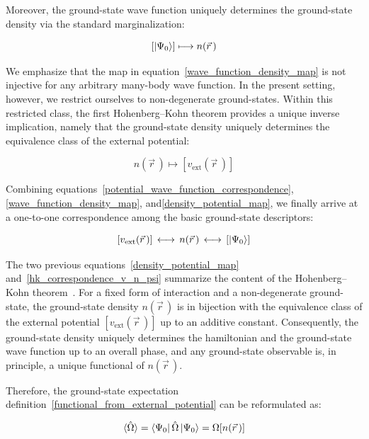 Moreover, the ground-state wave function uniquely determines the ground-state density via the standard marginalization:

\begin{equation}
    \left[\ket{\Psi_0}\right]\longmapsto n(\vec{r}\,)
\label{wave_function_density_map}
\end{equation}

We emphasize that the map in equation~\eqref{wave_function_density_map} is not injective for any arbitrary many-body wave function.
In the present setting, however, we restrict ourselves to non-degenerate ground-states. Within this restricted class, the first Hohenberg--Kohn theorem provides a unique inverse implication, namely that the ground-state density uniquely determines the equivalence class of the external potential:

\begin{equation}
    n(\vec{r}\,)\longmapsto\left[v_\mathrm{ext}(\vec{r}\,)\right]
\label{density_potential_map}
\end{equation}

Combining equations~\eqref{potential_wave_function_correspondence}, \eqref{wave_function_density_map},
and\eqref{density_potential_map}, we finally arrive at a one-to-one correspondence among the basic ground-state descriptors:

\begin{equation}
    \left[v_\mathrm{ext}(\vec{r}\,)\right]\,\longleftrightarrow\, n(\vec{r}\,)\,\longleftrightarrow\,\left[\ket{\Psi_0}\right]
\label{hk_correspondence_v_n_psi}
\end{equation}

The two previous equations~\eqref{density_potential_map} and~\eqref{hk_correspondence_v_n_psi} summarize the content of the Hohenberg--Kohn theorem~\cite{hohenberg1964inhomogeneous,burke2012perspective}.
For a fixed form of interaction and a non-degenerate ground-state, the ground-state density $n(\vec{r}\,)$ is in bijection with the equivalence class of the external potential $\left[v_\mathrm{ext}(\vec{r}\,)\right]$ up to an additive constant. 
Consequently, the ground-state density uniquely determines the hamiltonian and the ground-state wave function up to an overall phase,
and any ground-state observable is, in principle, a unique functional of $n(\vec{r}\,)$.

Therefore, the ground-state expectation definition~\eqref{functional_from_external_potential} can be reformulated as:

\begin{equation}
   \braket{\hat{\Omega}}= \bra{\Psi_0}\hat{\Omega}\ket{\Psi_0}=\Omega[n(\vec{r}\,)]
\label{functional_from_density}
\end{equation}

